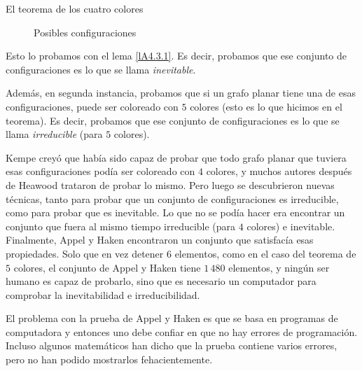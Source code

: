 \begin{section}{El teorema de los cuatro colores}
\begin{figure}[h]
    \begin{center}
    \end{center}
\caption{Posibles configuraciones} \label{fA4.13}
\end{figure}

Esto lo probamos con el lema \ref{lA4.3.1}. Es decir, probamos que ese conjunto de configuraciones es lo que se llama \textit{inevitable}.

Además, en segunda instancia, probamos que si un grafo planar tiene una de esas configuraciones, puede ser coloreado con $5$ colores (esto es lo que hicimos en el teorema). Es decir, probamos que ese conjunto de con\-fi\-gu\-ra\-cio\-nes es lo que se llama \textit{irreducible} (para $5$ colores). 

Kempe creyó que había sido capaz de probar que todo grafo planar que tuviera esas configuraciones podía ser coloreado con $4$ colores, y muchos autores después de Heawood trataron de probar lo mismo. Pero luego se descubrieron nuevas técnicas, tanto para probar que un conjunto de configuraciones es irreducible, como para probar que es inevitable. Lo que no se podía hacer era encontrar un conjunto que fuera al mismo tiempo irre\-du\-ci\-ble (para $4$ colores) e inevitable. Finalmente, Appel y Haken encontraron un conjunto que satisfacía esas propiedades. Solo que en vez detener $6$ elementos, como en el caso del teorema de $5$ colores, el conjunto de Appel y Haken tiene $1\,480$ elementos, y ningún ser humano es capaz de probarlo, sino que es necesario un computador para comprobar la inevitabilidad e irreducibilidad.

El problema con la prueba de  Appel y Haken es que se basa en programas de computadora y entonces uno debe confiar en que no hay errores de programación. Incluso algunos matemáticos han dicho que la prueba contiene varios errores, pero  no han podido mostrarlos fehacientemente. 


\end{section}

